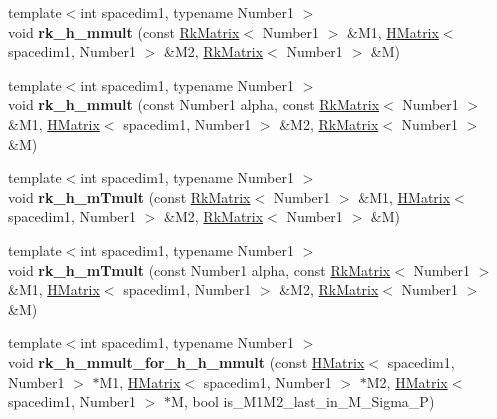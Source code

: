 \begin{DoxyCompactItemize}
\item 
\mbox{\label{classRkMatrix_afa94f9688a9443024a2631d2bfae06c8}} 
{\footnotesize template$<$int spacedim1, typename Number1 $>$ }\\void {\bfseries rk\+\_\+h\+\_\+mmult} (const \hyperlink{classRkMatrix}{Rk\+Matrix}$<$ Number1 $>$ \&M1, \hyperlink{classHMatrix}{H\+Matrix}$<$ spacedim1, Number1 $>$ \&M2, \hyperlink{classRkMatrix}{Rk\+Matrix}$<$ Number1 $>$ \&M)
\item 
\mbox{\label{classRkMatrix_a52a9c2821153dd59f0d230a997879ff3}} 
{\footnotesize template$<$int spacedim1, typename Number1 $>$ }\\void {\bfseries rk\+\_\+h\+\_\+mmult} (const Number1 alpha, const \hyperlink{classRkMatrix}{Rk\+Matrix}$<$ Number1 $>$ \&M1, \hyperlink{classHMatrix}{H\+Matrix}$<$ spacedim1, Number1 $>$ \&M2, \hyperlink{classRkMatrix}{Rk\+Matrix}$<$ Number1 $>$ \&M)
\item 
\mbox{\label{classRkMatrix_a0c04e99e7f40fb0c9f3dcc042e95882a}} 
{\footnotesize template$<$int spacedim1, typename Number1 $>$ }\\void {\bfseries rk\+\_\+h\+\_\+m\+Tmult} (const \hyperlink{classRkMatrix}{Rk\+Matrix}$<$ Number1 $>$ \&M1, \hyperlink{classHMatrix}{H\+Matrix}$<$ spacedim1, Number1 $>$ \&M2, \hyperlink{classRkMatrix}{Rk\+Matrix}$<$ Number1 $>$ \&M)
\item 
\mbox{\label{classRkMatrix_a2fddb7ff1c462d5605b63ea0b10bcc34}} 
{\footnotesize template$<$int spacedim1, typename Number1 $>$ }\\void {\bfseries rk\+\_\+h\+\_\+m\+Tmult} (const Number1 alpha, const \hyperlink{classRkMatrix}{Rk\+Matrix}$<$ Number1 $>$ \&M1, \hyperlink{classHMatrix}{H\+Matrix}$<$ spacedim1, Number1 $>$ \&M2, \hyperlink{classRkMatrix}{Rk\+Matrix}$<$ Number1 $>$ \&M)
\item 
\mbox{\label{classRkMatrix_a9b12cf1aa7504c436b84394f2116f6a9}} 
{\footnotesize template$<$int spacedim1, typename Number1 $>$ }\\void {\bfseries rk\+\_\+h\+\_\+mmult\+\_\+for\+\_\+h\+\_\+h\+\_\+mmult} (const \hyperlink{classHMatrix}{H\+Matrix}$<$ spacedim1, Number1 $>$ $\ast$M1, \hyperlink{classHMatrix}{H\+Matrix}$<$ spacedim1, Number1 $>$ $\ast$M2, \hyperlink{classHMatrix}{H\+Matrix}$<$ spacedim1, Number1 $>$ $\ast$M, bool is\+\_\+\+M1\+M2\+\_\+last\+\_\+in\+\_\+\+M\+\_\+\+Sigma\+\_\+P)

\end{DoxyCompactItemize}

